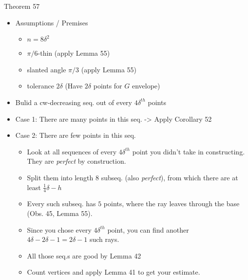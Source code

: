 Theorem 57
\begin{itemize}
  \item Assumptions / Premises
  \begin{itemize}
    \item $n=8\delta^2$
    \item $\pi/6$-thin (apply Lemma 55)
    \item slanted angle $\pi/3$ (apply Lemma 55)
    \item tolerance $2\delta$ (Have $2\delta$ points for $G$ envelope)
  \end{itemize}
  \item Bulid a cw-decreasing seq. out of every $4\delta^{th}$ points
  \item Case 1: There are many points in this seq. -> Apply Corollary 52
  \item Case 2: There are few points in this seq.
  \begin{itemize}
    \item Look at all sequences of every $4\delta^{th}$ point you didn't take in constructing. They are \emph{perfect} by construction.
    \item Split them into length $8$ subseq. (also \emph{perfect}), from which there are at least $\frac{1}{4}\delta - h$
    \item Every such subseq. has $5$ points, where the ray leaves through the base (Obs. 45, Lemma 55). 
    \item Since you chose every $4\delta^{th}$ point, you can find another $4\delta - 2\delta - 1 = 2\delta - 1$ such rays.
    \item All those seq.s are good by Lemma 42
    \item Count vertices and apply Lemma 41 to get your estimate.
  \end{itemize}
\end{itemize}











